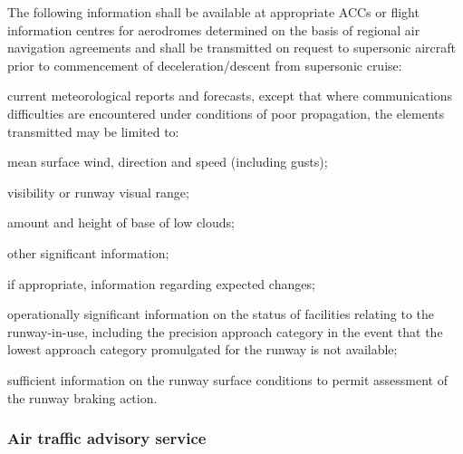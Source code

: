 \begin{enumeratesc}

    \begin{enumempty}
        \item The following information shall be available at appropriate ACCs or flight information centres for aerodromes determined on the basis of regional air navigation agreements and shall be transmitted on request to supersonic aircraft prior to commencement of deceleration/descent from supersonic cruise:
    \end{enumempty}
    \begin{enumalph}
        \item current meteorological reports and forecasts, except that where communications difficulties are encountered under conditions of poor propagation, the elements transmitted may be limited to:
        \begin{enumroman}
            \item mean surface wind, direction and speed (including gusts);
            \item visibility or runway visual range;
            \item amount and height of base of low clouds;
            \item other significant information;
            \item if appropriate, information regarding expected changes;
        \end{enumroman}

        \item operationally significant information on the status of facilities relating to the runway-in-use, including the precision approach category in the event that the lowest approach category promulgated for the runway is not available;
        \item sufficient information on the runway surface conditions to permit assessment of the runway braking action.
    \end{enumalph}
\end{enumeratesc}

\subsubsection{Air traffic advisory service}

